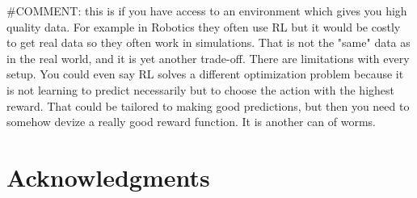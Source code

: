 \documentclass{article}
\begin{document}
#COMMENT: this is if you have access to an environment which gives you high quality data. For example in Robotics they often use RL but it would be costly to get real data so they often work in simulations. That is not the "same" data as in the real world, and it is yet another trade-off. There are limitations with every setup. You could even say RL solves a different optimization problem because it is not learning to predict necessarily but to choose the action with the highest reward. That could be tailored to making good predictions, but then you need to somehow devize a really good reward function. It is another can of worms. 

\section*{Acknowledgments}

{\footnotesize
  
}
% 



%
%
%
\end{document}

